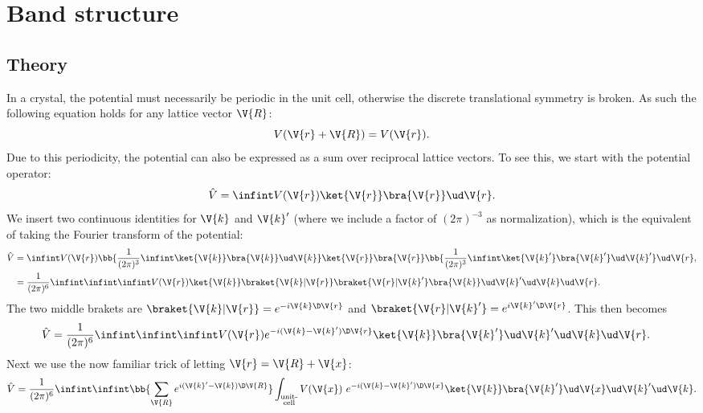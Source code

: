\documentclass[main.tex]{subfiles}
\begin{document}
	
	\section{Band structure}\label{sec:band_structure}
	\subsection{Theory}
	In a crystal, the potential must necessarily be periodic in the unit cell, otherwise the discrete translational symmetry is broken. As such the following equation holds for any lattice vector $ \V{R} $:
	\begin{equation}\label{eq:band_period_V}
		V(\V{r}+\V{R}) = V(\V{r}).
	\end{equation}
	Due to this periodicity, the potential can also be expressed as a sum over reciprocal lattice vectors. To see this, we start with the potential operator:
	\begin{equation}
		\hat{V} = \infint V(\V{r}) \ket{\V{r}}\bra{\V{r}}\ud \V{r}.
	\end{equation}
	We insert two continuous identities for $ \V{k} $ and $ \V{k}' $ (where we include a factor of $ (2\pi)^{-3} $ as normalization), which is the equivalent of taking the Fourier transform of the potential: 
	\begin{align}
		\hat{V} &= \infint V(\V{r}) \bb{ \frac{1}{(2\pi)^3}\infint \ket{\V{k}} \bra{\V{k}} \ud \V{k}  } \ket{\V{r}}\bra{\V{r}} \bb{\frac{1}{(2\pi)^3}\infint \ket{\V{k}'} \bra{\V{k}'} \ud \V{k}' } \ud \V{r} , \\
		&= \frac{1}{(2\pi)^6}\infint \infint \infint V(\V{r}) \ket{\V{k}} \braket{\V{k} | \V{r}} \braket{\V{r} | \V{k}'} \bra{\V{k}}  \ud\V{k}'   \ud\V{k}   \ud\V{r}.
	\end{align}
	The two middle brakets are $ \braket{\V{k}| \V{r}}= e^{-i \V{k} \D \V{r}} $ and $ \braket{\V{r} | \V{k}'} = e^{i \V{k}' \D \V{r}} $. This then becomes
	\begin{align}
		\hat{V} &= \frac{1}{(2\pi)^6}\infint \infint  \infint  V(\V{r}) e^{-i(\V{k}-\V{k}') \D \V{r}} \ket{\V{k}} \bra{\V{k}'} \ud\V{k}'   \ud\V{k}   \ud\V{r}.
	\end{align}
	Next we use the now familiar trick of letting $ \V{r} = \V{R} + \V{x} $:
	\begin{equation}
		\hat{V} = \frac{1}{(2\pi)^6}\infint \infint  \bb{\sum_{\V{R}} e^{i(\V{k}'-\V{k}) \D \V{R}}}  \int_{\substack{\text{unit-} \\\text{cell}}} V(\V{x})\  e^{-i (\V{k}-\V{k}') \D \V{x}} \ket{\V{k}} \bra{\V{k}'} \ud \V{x} \ud\V{k}'   \ud\V{k}.
	\end{equation}
\end{document}
